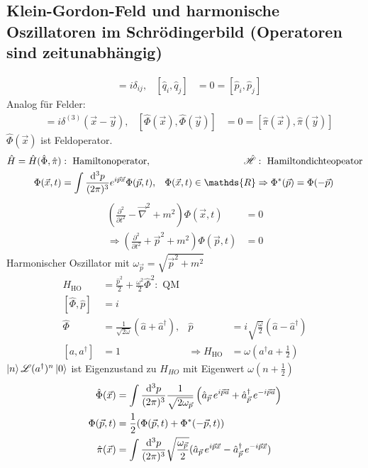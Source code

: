 \subsection{Klein-Gordon-Feld und harmonische Oszillatoren im Schrödingerbild (Operatoren sind zeitunabhängig)}
	\begin{align*}
		[\hat{q}_i, \hat{p}_j] &= i \delta_{ij},&
		[\hat{q}_i, \hat{q}_j] &= 0 = [\hat{p}_i, \hat{p}_j]
	\end{align*}
	Analog für Felder:
		\begin{align*}
			[\hat{\Phi}(\vec{x}), \hat{\pi}(\vec{y})] &= 
			i \delta^{(3)}(\vec{x}- \vec{y}),&
			[\hat{\Phi}(\vec{x}), \hat{\Phi}(\vec{y})] &= 0 = 
			[\hat{\pi}(\vec{x}), \hat{\pi}(\vec{y})]
		\end{align*}
	$\hat{\Phi}(\vec{x})$ ist Feldoperator.
		\begin{align*}
			\hat{H} = \hat{H} (\hat{\Phi}, \hat{\pi})&: 
			\text{ Hamiltonoperator},&
			\hat{\Ha}&: \text{ Hamiltondichteopeator} \\
			\Phi(\vec{x},t) &= \int \frac{\diff^3 p}{(2 \pi)^3} e^{i\vec{p}\vec{x}} \Phi(\vec{p},t),& 
			\Phi(\vec{x},t) \in \mathds{R}&\Rightarrow \Phi^* (\vec{p}) = \Phi (-\vec{p}) 
		\end{align*}
		\begin{align*}
			\left(
				\frac{\partial^2}{\partial t^2} - \vec{\nabla}^2 + m^2
			\right) \Phi(\vec{x}, t) &= 0 \\
			\Rightarrow \left(
				\frac{\partial^2}{\partial t^2} + \vec{p}^2 + m^2
			\right) \Phi(\vec{p}, t) &= 0
		\end{align*}
	Harmonischer Oszillator mit $\omega_{\vec{p}} = \sqrt{\vec{p}^2 + m^2}$
		\begin{align*}
			H_{\text{HO}} &= \frac{\hat{p}^2}{2} + \frac{\omega^2}{2} \hat{\Phi}^2 : \text{ QM} \\
			[\hat{\Phi}, \hat{p}] &= i \\
			\hat{\Phi} &= \frac{1}{\sqrt{2 \omega}} (\hat{a} + \hat{a}^\dagger),&
			\hat{p} &= i \sqrt{\frac{\omega}{2}}( \hat{a} - \hat{a}^\dagger) \\
			[a, a^\dagger] &= 1 & \Rightarrow
			H_{\text{HO}} &= \omega(a^\dagger a + \frac{1}{2})
		\end{align*}
	$\ket{n} \mathscr{L} (a^\dagger)^n \ket{0}$ ist Eigenzustand zu $H_{HO}$ mit Eigenwert $\omega (n + \frac{1}{2})$ 
		\begin{align*}
			\hat{\Phi} (\vec{x}) &= 
			\int \frac{\mathrm{d}^3 p}{(2 \pi)^3} \frac{1}{\sqrt{2 \omega_{\vec{p}}}}
			\left(	
				\hat{a}_{\vec{p}} \,e^{i\vec{p}\vec{a}} + \hat{a}^\dagger_{\vec{p}}\, e^{-i\vec{p}\vec{a}}
			\right) \\
			\Phi (\vec{p},t) &= \frac{1}{2} (\Phi(\vec{p},t) + \Phi^*(-\vec{p},t)) \\
			\hat{\pi}(\vec{x}) &= \int \frac{\mathrm{d}^3 p}{(2\pi)^3}
			\sqrt{\frac{\omega_{\vec{p}}}{2}} (\hat{a}_{\vec{p}} \,e^{i \vec{p} \vec{x}} -
			\hat{a}^\dagger_{\vec{p}} \,e^{- i \vec{p} \vec{x}}) 
		\end{align*}
